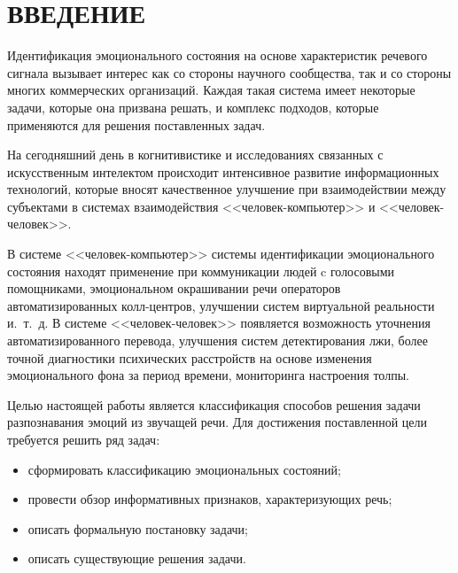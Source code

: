 \part*{ВВЕДЕНИЕ}

Идентификация эмоционального состояния на основе характеристик речевого сигнала вызывает интерес как со стороны научного сообщества, так и со стороны многих коммерческих организаций. Каждая такая система имеет некоторые задачи, которые она призвана решать, и комплекс подходов, которые применяются для решения поставленных задач.

На сегодняшний день в когнитивистике и исследованиях связанных с искусственным интелектом происходит интенсивное развитие информационных технологий, которые вносят качественное улучшение при взаимодействии между субъектами в системах взаимодействия <<человек-компьютер>> и <<человек-человек>>. 

В системе <<человек-компьютер>> системы идентификации эмоционального состояния находят применение при коммуникации людей c голосовыми помощниками, эмоциональном окрашивании речи операторов автоматизированных колл-центров, улучшении систем виртуальной реальности и.~т.~д. В системе <<человек-человек>> появляется возможность уточнения автоматизированного перевода, улучшения систем детектирования лжи, более точной диагностики психических расстройств на основе изменения эмоционального фона за период времени, мониторинга настроения толпы.


Целью настоящей работы является классификация способов решения задачи разпознавания эмоций из звучащей речи.
Для достижения поставленной цели требуется решить ряд задач:
\begin{itemize}
	\item сформировать классификацию эмоциональных состояний;
	\item провести обзор информативных признаков, характеризующих речь;
	\item описать формальную постановку задачи;
	\item описать существующие решения задачи.
\end{itemize}


